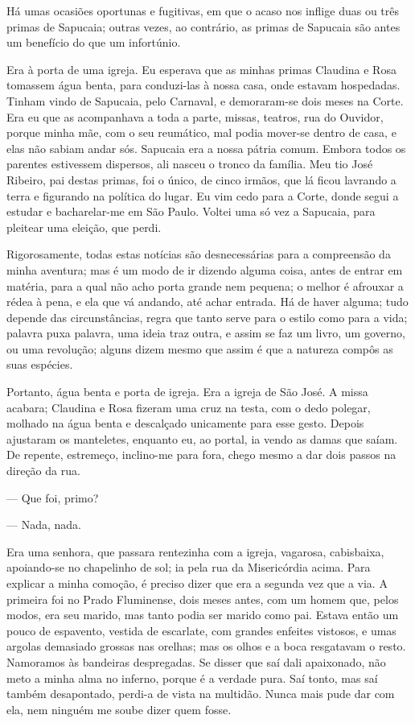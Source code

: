 
\noindent{}Há umas ocasiões oportunas e fugitivas, em que o acaso nos inflige duas
ou três primas de Sapucaia; outras vezes, ao contrário, as primas de
Sapucaia são antes um benefício do que um infortúnio.

Era à porta de uma igreja. Eu esperava que as minhas primas Claudina e
Rosa tomassem água benta, para conduzi-las à nossa casa, onde estavam
hospedadas. Tinham vindo de Sapucaia, pelo Carnaval, e demoraram-se dois
meses na Corte. Era eu que as acompanhava a toda a parte, missas,
teatros, rua do Ouvidor, porque minha mãe, com o seu reumático, mal
podia mover-se dentro de casa, e elas não sabiam andar sós. Sapucaia era
a nossa pátria comum. Embora todos os parentes estivessem dispersos, ali
nasceu o tronco da família. Meu tio José Ribeiro, pai destas primas, foi
o único, de cinco irmãos, que lá ficou lavrando a terra e figurando na
política do lugar. Eu vim cedo para a Corte, donde segui a estudar e
bacharelar-me em São Paulo. Voltei uma só vez a Sapucaia, para pleitear
uma eleição, que perdi.

Rigorosamente, todas estas notícias são desnecessárias para a
compreensão da minha aventura; mas é um modo de ir dizendo alguma coisa,
antes de entrar em matéria, para a qual não acho porta grande nem
pequena; o melhor é afrouxar a rédea à pena, e ela que vá andando, até
achar entrada. Há de haver alguma; tudo depende das circunstâncias,
regra que tanto serve para o estilo como para a vida; palavra puxa
palavra, uma ideia traz outra, e assim se faz um livro, um governo, ou
uma revolução; alguns dizem mesmo que assim é que a natureza compôs as
suas espécies.

Portanto, água benta e porta de igreja. Era a igreja de São José. A
missa acabara; Claudina e Rosa fizeram uma cruz na testa, com o dedo
polegar, molhado na água benta e descalçado unicamente para esse gesto.
Depois ajustaram os manteletes, enquanto eu, ao portal, ia vendo as
damas que saíam. De repente, estremeço, inclino-me para fora, chego
mesmo a dar dois passos na direção da rua.

--- Que foi, primo?

--- Nada, nada.

Era uma senhora, que passara rentezinha com a igreja, vagarosa,
cabisbaixa, apoiando-se no chapelinho de sol; ia pela rua da
Misericórdia acima. Para explicar a minha comoção, é preciso dizer que
era a segunda vez que a via. A primeira foi no Prado Fluminense, dois
meses antes, com um homem que, pelos modos, era seu marido, mas tanto
podia ser marido como pai. Estava então um pouco de espavento, vestida
de escarlate, com grandes enfeites vistosos, e umas argolas demasiado
grossas nas orelhas; mas os olhos e a boca resgatavam o resto. Namoramos
às bandeiras despregadas. Se disser que saí dali apaixonado, não meto a
minha alma no inferno, porque é a verdade pura. Saí tonto, mas saí
também desapontado, perdi-a de vista na multidão. Nunca mais pude dar
com ela, nem ninguém me soube dizer quem fosse.


